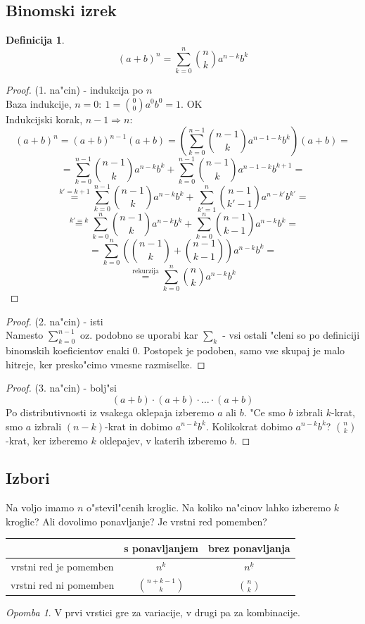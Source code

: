 \documentclass[a4paper,12pt]{article}
\theoremstyle{definition}
\newtheorem{defn}[counter]{Definicija}
\theoremstyle{remark}
\newtheorem*{rem}{Opomba}
\begin{document}
\subsection{Binomski izrek}
\begin{defn}
\[(a + b)^n = \sum_{k = 0}^{n}{\binom{n}{k} a^{n-k} b^k}\]
\end{defn}
\begin{proof}(1. na"cin) - indukcija po $n$\\
	Baza indukcije, $n = 0: \ 1 = \binom{0}{0} a^0b^0 = 1$. OK\\
	Indukcijski korak, $n - 1 \Rightarrow n$:
\[(a+b)^n = (a+b)^{n-1}(a+b) = (\sum_{k=0}^{n-1} \binom{n-1}{k} a^{n-1-k}b^k)(a+b) =\]
\[ = \sum_{k=0}^{n-1} \binom{n-1}{k} a^{n-k}b^k + \sum_{k=0}^{n-1} \binom{n-1}{k} a^{n-1-k}b^{k+1} =\]
\[\stackrel{k' = k + 1}{=} \sum_{k=0}^{n-1} \binom{n-1}{k} a^{n-k}b^k + \sum_{k'=1}^{n} \binom{n-1}{k'-1} a^{n-k'}b^{k'} = \]
\[\stackrel{k'=k}{=} \sum_{k=0}^{n} {\binom{n-1}{k}a^{n-k} b^k} + \sum_{k=0}^{n} {\binom{n-1}{k-1}a^{n-k} b^k} =\]
\[= \sum_{k=0}^n (\binom{n-1}{k} + \binom{n-1}{k-1})a^{n-k}b^k =\]
\[\stackrel{\text{rekurzija}}{=} \sum_{k=0}^n \binom{n}{k}a^{n-k}b^k\]
\end{proof}
\begin{proof}(2. na"cin) - isti\\
	Namesto $\sum_{k=0}^{n-1}$ oz. podobno se uporabi kar $\sum_k$ - vsi ostali "cleni so po definiciji binomskih koeficientov enaki 0. Postopek je podoben, samo vse skupaj je malo hitreje, ker presko"cimo vmesne razmiselke.
\end{proof}
\begin{proof}(3. na"cin) - bolj"si\\
\[(a+b) \cdot (a+b) \cdot \ldots \cdot (a+b)\]
Po distributivnosti iz vsakega oklepaja izberemo $a$ ali $b$. "Ce smo $b$ izbrali $k$-krat, smo $a$ izbrali $(n-k)$-krat in dobimo $a^{n-k}b^k$. Kolikokrat dobimo $a^{n-k}b^k$? $\binom{n}{k}$-krat, ker izberemo $k$ oklepajev, v katerih izberemo $b$.
\end{proof}


\subsection{Izbori}

Na voljo imamo $n$ o"stevil"cenih kroglic. Na koliko na"cinov lahko izberemo $k$ kroglic? Ali dovolimo ponavljanje? Je vrstni red pomemben?

\begin{tabular}{c|c|c}

 & s ponavljanjem & brez ponavljanja \\
\hline
vrstni red je pomemben & $n^k$ & $n^{\underline{k}}$\\
\hline
vrstni red ni pomemben & $\binom{n + k - 1}{k}$ & $\binom{n}{k}$
\end{tabular}
\begin{rem}
	V prvi vrstici gre za variacije, v drugi pa za kombinacije.
\end{rem}
\end{document}
